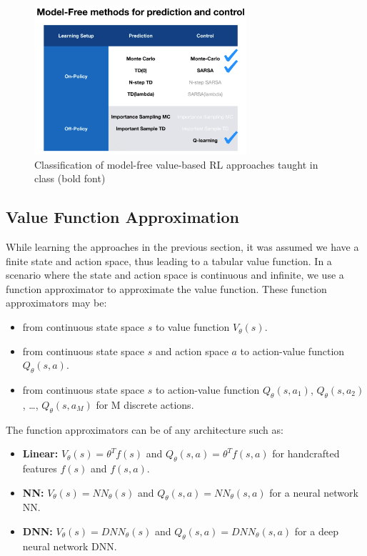 \documentclass[11pt]{article}
\begin{document}
\begin{figure}[H]
    \centering
    \includegraphics[width=0.7\textwidth]{model_free_classes.png}
    \caption{Classification of model-free value-based RL approaches taught in class (bold font)}
    \label{fig:model-free}
\end{figure}

\subsection{Value Function Approximation}

While learning the approaches in the previous section, it was assumed we have a finite state and action space, thus leading to a tabular value function. In a scenario where the state and action space is continuous and infinite, we use a function approximator to approximate the value function. These function approximators may be:

\begin{itemize}
    \item from continuous state space $s$ to value function $V_{\theta}(s)$.
    \item from continuous state space $s$ and action space $a$ to action-value function $Q_{\theta}(s,a)$. 
    \item from continuous state space $s$ to action-value function $Q_{\theta}(s,a_1)$, $Q_{\theta}(s,a_2)$, \ldots, $Q_{\theta}(s,a_M)$ for M discrete actions.

\end{itemize}

The function approximators can be of any architecture such as:

\begin{itemize}
    \item \textbf{Linear:} $V_{\theta}(s) = \theta^Tf(s)$ and $Q_{\theta}(s,a) = \theta^Tf(s,a)$ for handcrafted features $f(s)$ and $f(s,a)$.
    \item \textbf{NN:} $V_{\theta}(s) = NN_{\theta}(s)$ and $Q_{\theta}(s,a) = NN_{\theta}(s,a)$ for a neural network NN.
    \item \textbf{DNN:} $V_{\theta}(s) = DNN_{\theta}(s)$ and $Q_{\theta}(s,a) = DNN_{\theta}(s,a)$ for a deep neural network DNN.
\end{itemize}
\end{document}
